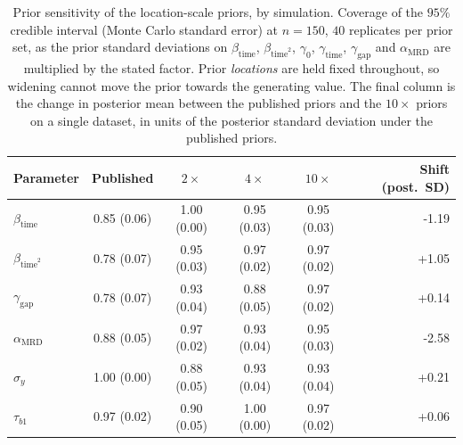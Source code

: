 \begin{table}[!htbp]
\centering
\caption{Prior sensitivity of the location-scale priors, by simulation. Coverage of the $95\%$ credible interval (Monte Carlo standard error) at $n=150$, $40$ replicates per prior set, as the prior standard deviations on $\beta_{\mathrm{time}}$, $\beta_{\mathrm{time}^2}$, $\gamma_0$, $\gamma_{\mathrm{time}}$, $\gamma_{\mathrm{gap}}$ and $\alpha_{\mathrm{MRD}}$ are multiplied by the stated factor. Prior \emph{locations} are held fixed throughout, so widening cannot move the prior towards the generating value. The final column is the change in posterior mean between the published priors and the $10\times$ priors on a single dataset, in units of the posterior standard deviation under the published priors.}
\label{tab:prior-widening}
\small
\begin{tabular}{lccccr}
\toprule
Parameter & Published & $2\times$ & $4\times$ & $10\times$ & Shift (post.\ SD)\\
\midrule
$\beta_{\mathrm{time}}$ & 0.85 (0.06) & 1.00 (0.00) & 0.95 (0.03) & 0.95 (0.03) & -1.19\\
$\beta_{\mathrm{time}^2}$ & 0.78 (0.07) & 0.95 (0.03) & 0.97 (0.02) & 0.97 (0.02) & +1.05\\
$\gamma_{\mathrm{gap}}$ & 0.78 (0.07) & 0.93 (0.04) & 0.88 (0.05) & 0.97 (0.02) & +0.14\\
$\alpha_{\mathrm{MRD}}$ & 0.88 (0.05) & 0.97 (0.02) & 0.93 (0.04) & 0.95 (0.03) & -2.58\\
$\sigma_y$ & 1.00 (0.00) & 0.88 (0.05) & 0.93 (0.04) & 0.93 (0.04) & +0.21\\
$\tau_{b1}$ & 0.97 (0.02) & 0.90 (0.05) & 1.00 (0.00) & 0.97 (0.02) & +0.06\\
\bottomrule
\end{tabular}
\end{table}

